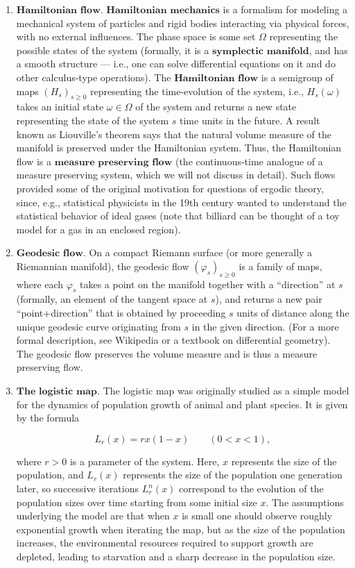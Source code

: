 \documentclass[11pt]{report}
\theoremstyle{plain}
\theoremstyle{definition}
\begin{document}
\begin{enumerate}[label=\arabic*.]
\[
\mu(A) = \iiint_A \frac{\sin \theta}{\sin\theta_1} \,d\theta\,d\phi\,d\ell.
\]
\item $\textbf{Hamiltonian flow.}$ $\textbf{Hamiltonian mechanics}$ is a formalism for modeling a mechanical system of particles and rigid bodies interacting via physical forces, with no external influences. The phase space is some set $\Omega$ representing the possible states of the system (formally, it is a $\textbf{symplectic manifold}$, and has a smooth structure --- i.e.,  one can solve differential equations on it and do other calculus-type operations). The $\textbf{Hamiltonian flow}$ is a semigroup of maps $(H_s)_{s\ge 0}$ representing the time-evolution of the system, i.e., $H_s(\omega)$ takes an initial state $\omega\in\Omega$ of the system and returns a new state representing the state of the system $s$ time units in the future. A result known as Liouville's theorem says that the natural volume measure of the manifold is preserved under the Hamiltonian system. Thus, the Hamiltonian flow is a $\textbf{measure preserving flow}$ (the continuous-time analogue of a measure preserving system, which we will not discuss in detail). Such flows provided some of the original motivation for questions of ergodic theory, since, e.g., statistical physicists in the 19th century wanted to understand the statistical behavior of ideal gases (note that billiard can be thought of a toy model for a gas in an enclosed region).
\item $\textbf{Geodesic flow.}$ On a compact Riemann surface (or more generally a Riemannian manifold), the geodesic flow $(\varphi_s)_{s\ge0}$ is a family of maps, where each $\varphi_s$ takes a point on the manifold together with a ``direction'' at $s$ (formally, an element of the tangent space at $s$), and returns a new pair ``point+direction'' that is obtained by proceeding $s$ units of distance along the unique geodesic curve originating from $s$ in the given direction. (For a more formal description, see Wikipedia or a textbook on differential geometry). The geodesic flow preserves the volume measure and is thus a measure preserving flow.
\item $\textbf{The logistic map.}$ The logistic map was originally studied as a simple model for the dynamics of population growth of animal and plant species. It is given by the formula

\[
L_r(x) = rx(1-x) \qquad (0<x<1),
\]

where $r>0$ is a parameter of the system. Here, $x$ represents the size of the population, and $L_r(x)$ represents the size of the population one generation later, so successive iterations $L_r^{n}(x)$ correspond to the evolution of the population sizes over time starting from some initial size $x$. The assumptions underlying the model are that when $x$ is small one should observe roughly exponential growth when iterating the map, but as the size of the population increases, the environmental resources required to support growth are depleted, leading to starvation and a sharp decrease in the population size.


\end{enumerate}
\end{document}
